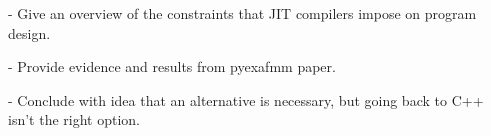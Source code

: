 - Give an overview of the constraints that JIT compilers impose on program design.

- Provide evidence and results from pyexafmm paper.

- Conclude with idea that an alternative is necessary, but going back to C++ isn't the right option.

